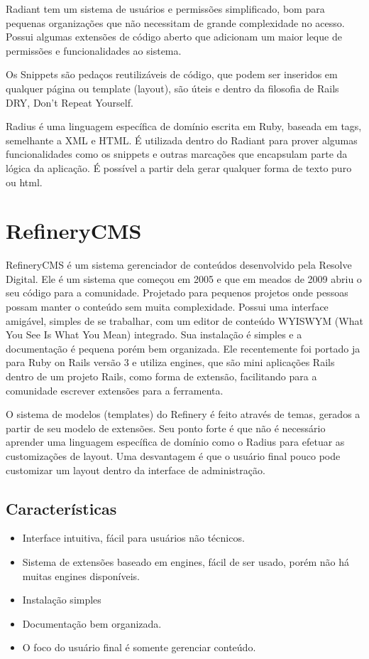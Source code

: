 Radiant tem um sistema de usuários e permissões simplificado, bom para pequenas organizações que não necessitam de grande complexidade no acesso. Possui algumas extensões de código aberto que adicionam um maior leque de permissões e funcionalidades ao sistema.

Os Snippets são pedaços reutilizáveis de código, que podem ser inseridos em qualquer página ou template (layout), são úteis e dentro da filosofia de Rails DRY, Don't Repeat Yourself. 

Radius é uma linguagem específica de domínio escrita em Ruby, baseada em tags, semelhante a XML e HTML. É utilizada dentro do Radiant para prover algumas funcionalidades como os snippets e outras marcações que encapsulam parte da lógica da aplicação. É possível a partir dela gerar qualquer forma de texto puro ou html. 

\section{RefineryCMS}

RefineryCMS é um sistema gerenciador de conteúdos desenvolvido pela Resolve Digital. Ele é um sistema que começou em 2005 e que em meados de 2009 abriu o seu código para a comunidade. Projetado para pequenos projetos onde pessoas possam manter o conteúdo sem muita complexidade. Possui uma interface amigável, simples de se trabalhar, com um editor de conteúdo WYISWYM (What You See Is What You Mean) integrado. Sua instalação é simples e a documentação é pequena porém bem organizada. Ele recentemente foi portado ja para  Ruby on Rails versão 3 e utiliza engines, que são mini aplicações Rails dentro de um projeto Rails, como forma de extensão, facilitando para a comunidade escrever extensões para a ferramenta. 

O sistema de modelos (templates) do Refinery é feito através de temas, gerados a partir de seu modelo de extensões. Seu ponto forte é que não é necessário aprender uma linguagem específica de domínio como o Radius para efetuar as customizações de layout. Uma desvantagem é que o usuário final pouco pode customizar um layout dentro da interface de administração.

\subsection{Características}

\begin{itemize}
  \item Interface intuitiva, fácil para usuários não técnicos.
  \item Sistema de extensões baseado em engines, fácil de ser usado, porém não há muitas engines disponíveis.
  \item Instalação simples
  \item Documentação bem organizada.
  \item O foco do usuário final é somente gerenciar conteúdo.
\end{itemize}

